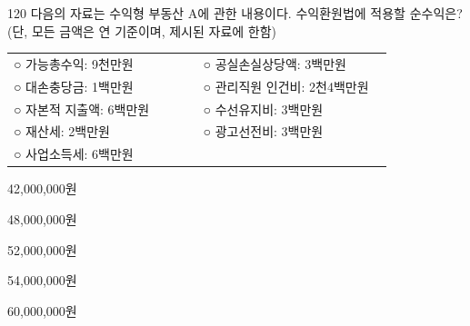 \begin{question}{120}
다음의 자료는 수익형 부동산 A에 관한 내용이다. 수익환원법에 적용할 순수익은? (단, 모든 금액은 연 기준이며, 제시된 자료에 한함)
\begin{framedtext}
\begin{tabular}{@{}p{0.47\linewidth}@{}p{0.47\linewidth}@{}}
○ 가능총수익: 9천만원 & ○ 공실손실상당액: 3백만원 \\
○ 대손충당금: 1백만원 & ○ 관리직원 인건비: 2천4백만원 \\
○ 자본적 지출액: 6백만원 & ○ 수선유지비: 3백만원 \\
○ 재산세: 2백만원 & ○ 광고선전비: 3백만원 \\
○ 사업소득세: 6백만원 &  \\
\end{tabular}
\end{framedtext}
\begin{choices}
  \item 42,000,000원
  \item 48,000,000원
  \item 52,000,000원
  \item 54,000,000원
  \item 60,000,000원
\end{choices}
\end{question}
